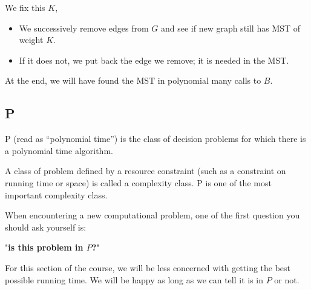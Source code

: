 We fix this $K$,
\begin{itemize}
	\item We successively remove edges from $G$ and see if new graph still has MST of weight $K$.
	\item If it does not, we put back the edge we remove; it is needed in the MST.
\end{itemize}

At the end, we will have found the MST in polynomial many calls to $B$.

\subsection{P}
P (read as ``polynomial time'') is the class of decision problems for which there is a polynomial time algorithm.

A class of problem defined by a resource constraint (such as a constraint on running time or space) is called a complexity class. P is one of the most important complexity class.

When encountering a new computational problem, one of the first question you should ask yourself is: 

"\textbf{is this problem in $P$?}"

For this section of the course, we will be less concerned with getting the best possible running time. We will be happy as long as we can tell it is in $P$ or not.













